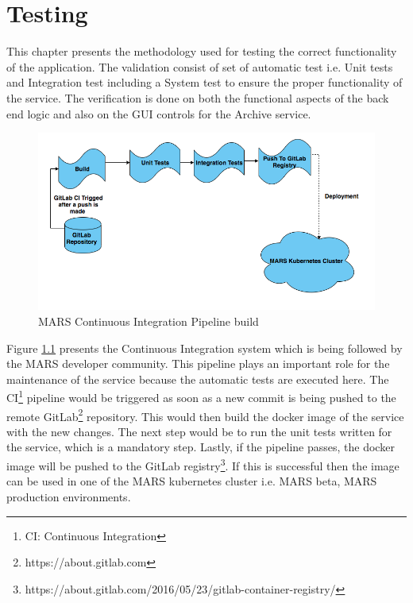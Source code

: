 \chapter{Testing}
This chapter presents the methodology used for testing the correct functionality of the application. The validation consist of set of automatic test i.e.
Unit tests and Integration test including a System test to ensure the proper functionality of the service. The verification is done on both the functional
aspects of the back end logic and also on the GUI controls for the Archive service.

\begin{figure}[H]
    \centering \includegraphics[scale=0.5]{grafiken/CIbuild.png}
    \caption{MARS Continuous Integration Pipeline build}
    \label{fig:CIbuild}
\end{figure}

Figure \ref{fig:CIbuild} presents the Continuous Integration system which is being followed by the MARS developer community. This pipeline plays an important role
for the maintenance of the service because the automatic tests are executed here.
The CI\footnote{CI: Continuous Integration} pipeline would be triggered as soon as a new commit is being pushed to the remote 
GitLab\footnote{https://about.gitlab.com} repository. This would then build the docker image of the service with the new changes. The next step would be to
run the unit tests written for the service, which is a mandatory step. Lastly, if the pipeline passes, the docker image will be pushed
to the GitLab registry\footnote{https://about.gitlab.com/2016/05/23/gitlab-container-registry/}. If this is successful then the image can be used in one of 
the MARS kubernetes cluster i.e. MARS beta, MARS production environments. 




